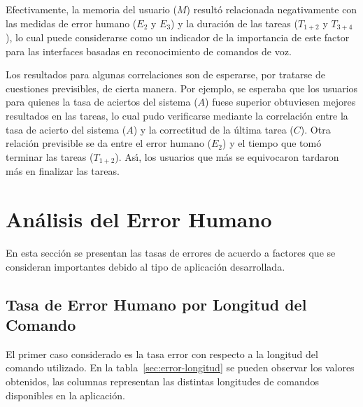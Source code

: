 Efectivamente, la memoria del usuario ($M$) result\'o relacionada negativamente con las medidas 
de error humano ($E_2$ y $E_3$) y la duraci\'on de las tareas ($T_{1+2}$ y $T_{3+4}$), lo cual 
puede considerarse como un indicador de la importancia de este factor para las interfaces basadas en
reconocimiento de comandos de voz.

Los resultados para algunas correlaciones son de esperarse, por tratarse de cuestiones
previsibles, de cierta manera. Por ejemplo, se esperaba que los usuarios para 
quienes la tasa de aciertos del sistema ($A$) fuese
superior obtuviesen mejores resultados en las tareas, lo cual pudo verificarse mediante la 
correlaci\'on entre la tasa de acierto del sistema ($A$) y la correctitud de la \'ultima tarea ($C$). Otra 
relaci\'on previsible se da entre el error humano ($E_2$) y el tiempo que tom\'o terminar las tareas ($T_{1+2}$). 
As{{\'\i}}, los usuarios que m\'as se equivocaron tardaron m\'as en finalizar las tareas.


\section{An\'alisis del Error Humano}
\label{sec:resultados-error-humano}

En esta secci\'on se presentan las tasas de errores de acuerdo a factores que se consideran importantes debido
al tipo de aplicaci\'on desarrollada. 

\subsection{Tasa de Error Humano por Longitud del Comando}
El primer caso considerado es la tasa error con respecto a la longitud del comando
utilizado. En la tabla~\ref{sec:error-longitud} se pueden observar los valores obtenidos, las columnas
representan las distintas longitudes de comandos disponibles en la aplicaci\'on.


